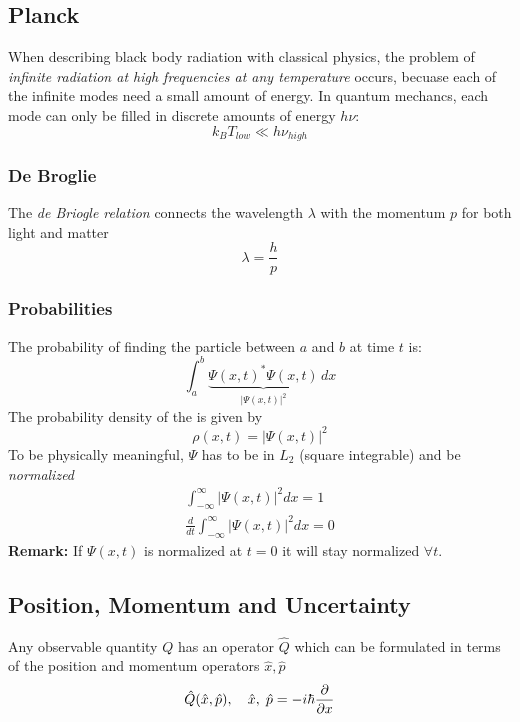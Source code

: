 \subsection{Planck}
When describing black body radiation with classical physics, the problem of \textit{infinite radiation at
    high frequencies at any temperature} occurs, becuase each of the infinite modes need a small amount of energy.
In quantum mechancs, each mode can only be filled in discrete amounts of energy $h \nu$:
\begin{equation*}
    k_B T_{low} \ll h\nu_{high}
\end{equation*}

\subsubsection{De Broglie}
The \textit{de Briogle relation} connects the wavelength $\lambda$ with the momentum $p$ for both light and matter
\begin{equation*}
    \lambda = \frac{h}{p}
\end{equation*}

\subsubsection{Probabilities}
The probability of finding the particle between $a$ and $b$ at time $t$ is:
\begin{equation*}
    \int_a^b \underbrace{{\Psi(x,t)}^*\Psi(x,t)}_{|\Psi(x,t)|^2}\,dx
\end{equation*}
The probability density of the is given by
\begin{equation*}
    \rho(x,t) = |\Psi(x,t)|^2
\end{equation*}
To be physically meaningful, $\Psi$ has to be in $L_2$ (square integrable) and be \textit{normalized}
\begin{align*}
    \int_{-\infty}^{\infty} |\Psi(x,t)|^2 dx = 1 \\
    \frac{d}{dt}\int_{-\infty}^{\infty} |\Psi(x,t)|^2 dx = 0
\end{align*}
\textbf{Remark:} If $\Psi(x,t)$ is normalized at $t=0$ it will stay normalized $\forall t$.


\subsection{Position, Momentum and Uncertainty}
Any observable quantity $Q$ has an operator $\hat{Q}$ which can be formulated in terms of the position and momentum operators $\hat{x}, \hat{p}$
\begin{equation*}
    \hat{Q}(\hat{x},\hat{p}), \hspace*{10pt} \hat{x},\; \hat{p}=-i\hbar \frac{\partial}{\partial x}
\end{equation*}


